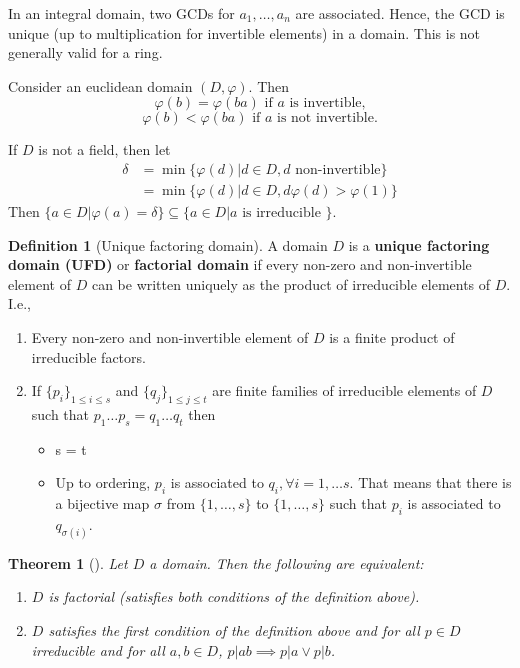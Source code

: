 \documentclass[12pt,a4paper]{article}
\newtheorem{theorem}{Theorem}[section]
\theoremstyle{definition}
\newtheorem{definition}{Definition}[section]
\begin{document}
In an integral domain, two GCDs for $a_1, \ldots, a_n$ are associated. Hence, the GCD is unique (up to multiplication for invertible elements) in a domain. This is not generally valid for a ring.

Consider an euclidean domain $(D, \varphi)$. Then 
\[
\varphi (b) = \varphi (ba) \text{ if $a$ is invertible,}
\]
\[
\varphi (b) < \varphi (ba) \text{ if $a$ is not invertible.}
\]

If $D$ is not a field, then let
\begin{equation*}
\begin{aligned}
\delta & = \min \{ \varphi (d) | d \in D, d \text{ non-invertible} \} \\
& = \min \{ \varphi (d) | d \in D, d \varphi (d) > \varphi (1) \}
\end{aligned}
\end{equation*}
Then $\{ a \in D | \varphi (a) = \delta \} \subseteq \{ a \in D | a \text{ is irreducible } \}$.

\begin{definition}[Unique factoring domain]
A domain $D$ is a \textbf{unique factoring domain (UFD)} or \textbf{factorial domain} if every non-zero and non-invertible element of $D$ can be written uniquely as the product of irreducible elements of $D$. I.e.,
\begin{enumerate}
\item Every non-zero and non-invertible element of $D$ is a finite product of irreducible factors.
\item If $\{ p_i \}_{1 \leq i \leq s}$ and $\{ q_j \}_{1 \leq j \leq t}$ are finite families of irreducible elements of $D$ such that $p_1 \ldots p_s = q_1 \ldots q_t$ then
\begin{itemize}
\item s = t
\item Up to ordering, $p_i$ is associated to $q_i, \forall i = 1, \ldots s$. That means that there is a bijective map $\sigma$ from $\{ 1, \ldots, s \}$ to $\{ 1, \ldots, s \}$ such that $p_i$ is associated to $q_{\sigma (i)}$.
\end{itemize}
\end{enumerate}
\end{definition}

\begin{theorem}[]
Let $D$ a domain. Then the following are equivalent:
\begin{enumerate}
\item $D$ is factorial (satisfies both conditions of the definition above).
\item $D$ satisfies the first condition of the definition above and for all $p \in D$ irreducible and for all $a,b \in D$, $p | ab \implies p | a \lor p| b$.
\end{enumerate}
\end{theorem}
\end{document}
